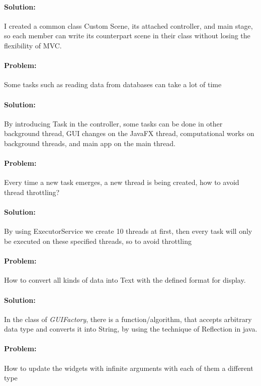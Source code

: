\documentclass[a4paper,12pt]{report}
\begin{document}
	\paragraph*{Solution:}I created a common class Custom Scene, its attached controller, and main stage, so each member can write its counterpart scene in their class without losing the flexibility of MVC.

	\paragraph{Problem:}Some tasks such as reading data from databases can take a lot of time

	\paragraph*{Solution:}By introducing Task in the controller, some tasks can be done in other background thread,  GUI changes on the JavaFX thread, computational works on background threads, and main app on the main thread. 

	\paragraph{Problem:}Every time a new task emerges, a new thread is being created, how to avoid thread throttling?

	\paragraph*{Solution:}By using ExecutorService we create 10 threads at first, then every task will only be executed on these specified threads, so to avoid throttling

	\paragraph{Problem:}How to convert all kinds of data into Text with the defined format for display.

	\paragraph*{Solution:}In the class of \textit{GUIFactory}, there is a function/algorithm, that accepts arbitrary data type and converts it into String, by using the technique of Reflection in java.

	\paragraph{Problem:}How to update the  widgets with infinite arguments with each of them a different type
\end{document}
